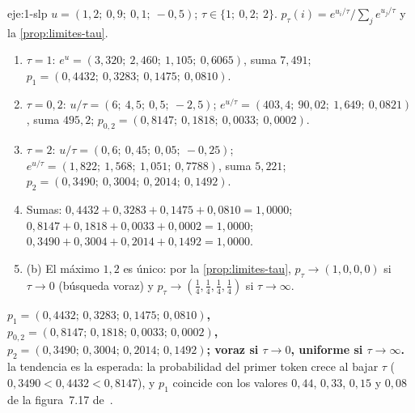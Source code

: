 \begin{solucion}{eje:1-slp}
\datos $u=(1{,}2;\allowbreak\ 0{,}9;\allowbreak\ 0{,}1;\allowbreak\ -0{,}5)$; $\tau\in\{1;\allowbreak\ 0{,}2;\allowbreak\ 2\}$.
\planteamiento $p_\tau(i)=e^{u_i/\tau}/\sum_j e^{u_j/\tau}$ y la \cref{prop:limites-tau}.
\pasos
\begin{enumerate}[label=\arabic*.]
  \item $\tau=1$: $e^{u}=(3{,}320;\allowbreak\ 2{,}460;\allowbreak\ 1{,}105;\allowbreak\ 0{,}6065)$, suma $7{,}491$; $p_1=(0{,}4432;\allowbreak\ 0{,}3283;\allowbreak\ 0{,}1475;\allowbreak\ 0{,}0810)$.
  \item $\tau=0{,}2$: $u/\tau=(6;\allowbreak\ 4{,}5;\allowbreak\ 0{,}5;\allowbreak\ -2{,}5)$; $e^{u/\tau}=(403{,}4;\allowbreak\ 90{,}02;\allowbreak\ 1{,}649;\allowbreak\ 0{,}0821)$, suma $495{,}2$; $p_{0{,}2}=(0{,}8147;\allowbreak\ 0{,}1818;\allowbreak\ 0{,}0033;\allowbreak\ 0{,}0002)$.
  \item $\tau=2$: $u/\tau=(0{,}6;\allowbreak\ 0{,}45;\allowbreak\ 0{,}05;\allowbreak\ -0{,}25)$; $e^{u/\tau}=(1{,}822;\allowbreak\ 1{,}568;\allowbreak\ 1{,}051;\allowbreak\ 0{,}7788)$, suma $5{,}221$; $p_2=(0{,}3490;\allowbreak\ 0{,}3004;\allowbreak\ 0{,}2014;\allowbreak\ 0{,}1492)$.
  \item Sumas: $0{,}4432+0{,}3283+0{,}1475+0{,}0810=1{,}0000$; $0{,}8147+0{,}1818+0{,}0033+0{,}0002=1{,}0000$; $0{,}3490+0{,}3004+0{,}2014+0{,}1492=1{,}0000$.
  \item (b) El máximo $1{,}2$ es único: por la \cref{prop:limites-tau}, $p_\tau\to(1,0,0,0)$ si $\tau\to 0$ (búsqueda voraz) y $p_\tau\to(\frac14,\frac14,\frac14,\frac14)$ si $\tau\to\infty$.
\end{enumerate}
\resultado \textbf{$p_1=(0{,}4432;\allowbreak\,0{,}3283;\allowbreak\,0{,}1475;\allowbreak\,0{,}0810)$, $p_{0{,}2}=(0{,}8147;\allowbreak\,0{,}1818;\allowbreak\,0{,}0033;\allowbreak\,0{,}0002)$, $p_2=(0{,}3490;\allowbreak\,0{,}3004;\allowbreak\,0{,}2014;\allowbreak\,0{,}1492)$; voraz si $\tau\to 0$, uniforme si $\tau\to\infty$.}
\comprobacion la tendencia es la esperada: la probabilidad del primer token crece al bajar $\tau$ ($0{,}3490<0{,}4432<0{,}8147$), y $p_1$ coincide con los valores $0{,}44$, $0{,}33$, $0{,}15$ y $0{,}08$ de la figura~7.17 de~\cite{jm3}.
\end{solucion}

